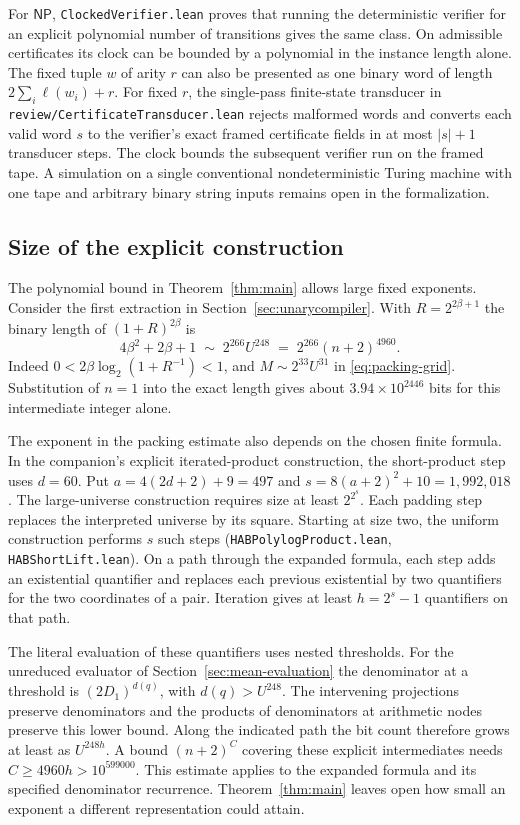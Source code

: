 \documentclass[11pt,letterpaper]{article}
\numberwithin{equation}{section}
\newcommand{\NP}{\mathsf{NP}}
\begin{document}
For $\NP$, \texttt{ClockedVerifier.lean} proves that running the deterministic verifier for an explicit polynomial number of transitions gives the same class. On admissible certificates its clock can be bounded by a polynomial in the instance length alone. The fixed tuple $w$ of arity $r$ can also be presented as one binary word of length $2\sum_i\ell(w_i)+r$. For fixed $r$, the single-pass finite-state transducer in \texttt{review/CertificateTransducer.lean} rejects malformed words and converts each valid word $s$ to the verifier's exact framed certificate fields in at most $|s|+1$ transducer steps. The clock bounds the subsequent verifier run on the framed tape. A simulation on a single conventional nondeterministic Turing machine with one tape and arbitrary binary string inputs remains open in the formalization.

\subsection{Size of the explicit construction}\label{sec:literal-size}
The polynomial bound in Theorem~\ref{thm:main} allows large fixed exponents. Consider the first extraction in Section~\ref{sec:unarycompiler}. With $R=2^{2\beta+1}$ the binary length of $(1+R)^{2\beta}$ is
\[
    4\beta^2+2\beta+1
    \;\sim\; 2^{266} U^{248}
    \;=\;2^{266}(n+2)^{4960}.
\]
Indeed $0<2\beta\log_2(1+R^{-1})<1$, and $M\sim 2^{33}U^{31}$ in \eqref{eq:packing-grid}. Substitution of $n=1$ into the exact length gives about $3.94\times10^{2446}$ bits for this intermediate integer alone.

The exponent in the packing estimate also depends on the chosen finite formula. In the companion's explicit iterated-product construction, the short-product step uses $d=60$. Put $a=4(2d+2)+9=497$ and $s=8(a+2)^2+10=1{,}992{,}018$. The large-universe construction requires size at least $2^{2^s}$. Each padding step replaces the interpreted universe by its square. Starting at size two, the uniform construction performs $s$ such steps (\texttt{HABPolylogProduct.lean}, \texttt{HABShortLift.lean}). On a path through the expanded formula, each step adds an existential quantifier and replaces each previous existential by two quantifiers for the two coordinates of a pair. Iteration gives at least $h=2^s-1$ quantifiers on that path.

The literal evaluation of these quantifiers uses nested thresholds. For the unreduced evaluator of Section~\ref{sec:mean-evaluation} the denominator at a threshold is $(2D_1)^{d(q)}$, with $d(q)>U^{248}$. The intervening projections preserve denominators and the products of denominators at arithmetic nodes preserve this lower bound. Along the indicated path the bit count therefore grows at least as $U^{248h}$. A bound $(n+2)^C$ covering these explicit intermediates needs $C\ge4960h>10^{599000}$. This estimate applies to the expanded formula and its specified denominator recurrence. Theorem~\ref{thm:main} leaves open how small an exponent a different representation could attain.
\end{document}
